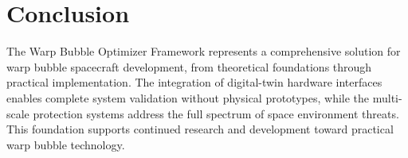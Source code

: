 \documentclass[11pt]{article}
\begin{document}
\section{Conclusion}

The Warp Bubble Optimizer Framework represents a comprehensive solution for warp bubble spacecraft development, from theoretical foundations through practical implementation. The integration of digital-twin hardware interfaces enables complete system validation without physical prototypes, while the multi-scale protection systems address the full spectrum of space environment threats. This foundation supports continued research and development toward practical warp bubble technology.
\end{document}
